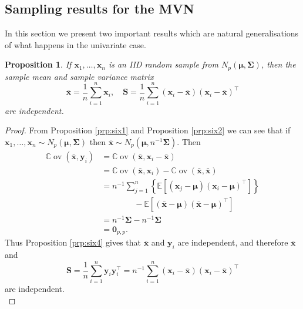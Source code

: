 \documentclass[]{book}
\newtheorem{proposition}{Proposition}[chapter]
\theoremstyle{definition}
\theoremstyle{definition}
\theoremstyle{definition}
\theoremstyle{remark}
\begin{document}
\hypertarget{sampling-results-for-the-mvn}{%
\subsection{Sampling results for the MVN}\label{sampling-results-for-the-mvn}}

In this section we present two important results which are natural
generalisations of what happens in the univariate case.

\begin{proposition}
\protect\hypertarget{prp:six6}{}{\label{prp:six6} }If \(\boldsymbol x_1, \ldots, \boldsymbol x_n\) is an IID random sample from \(N_p(\boldsymbol \mu, \boldsymbol \Sigma)\), then the sample mean and sample variance matrix
\[\bar{\boldsymbol x} = \frac{1}{n} \sum_{i=1}^n \boldsymbol x_i, \quad \boldsymbol S= \frac{1}{n} \sum_{i=1}^n (\boldsymbol x_i - \bar{\boldsymbol x})(\boldsymbol x_i-\bar{\boldsymbol x})^\top\] are independent.
\end{proposition}

\begin{proof}
{}From Proposition \ref{prp:six1} and Proposition \ref{prp:six2} we can see that if \(\boldsymbol x_1, \ldots, \boldsymbol x_n \sim N_p(\boldsymbol \mu, \boldsymbol \Sigma)\) then \(\bar{\boldsymbol x} \sim N_p (\boldsymbol \mu, n^{-1}\boldsymbol \Sigma)\). Then
\begin{align*}
{\mathbb{C}\operatorname{ov}}(\bar{\boldsymbol x},\boldsymbol y_i)&={\mathbb{C}\operatorname{ov}}(\bar{\boldsymbol x}, \boldsymbol x_i -\bar{\boldsymbol x})\\
&={\mathbb{C}\operatorname{ov}}(\bar{\boldsymbol x}, \boldsymbol x_i) - {\mathbb{C}\operatorname{ov}}(\bar{\boldsymbol x}, \bar{\boldsymbol x})\\
&=n^{-1}\sum_{j=1}^n \left \{{\mathbb{E}}[(\boldsymbol x_j -\boldsymbol \mu)(\boldsymbol x_i-\boldsymbol \mu)^\top]\right \}\\
& \qquad \qquad -{\mathbb{E}}[(\bar{\boldsymbol x}-\boldsymbol \mu)(\bar{\boldsymbol x}-\boldsymbol \mu)^\top]\\
&=n^{-1}\boldsymbol \Sigma- n^{-1}\boldsymbol \Sigma\\
&= {\mathbf 0}_{p,p}.
\end{align*}
Thus Proposition \ref{prp:six4} gives that \(\bar{\boldsymbol x}\) and \(\boldsymbol y_i\) are independent, and therefore \(\bar{\boldsymbol x}\) and
\[
\boldsymbol S=\frac{1}{n}\sum_{i=1}^n \boldsymbol y_i \boldsymbol y_i^\top =n^{-1}\sum_{i=1}^n (\boldsymbol x_i -\bar{\boldsymbol x})(\boldsymbol x_i -\bar{\boldsymbol x})^\top
\]
are independent.\\
\end{proof}
\end{document}
